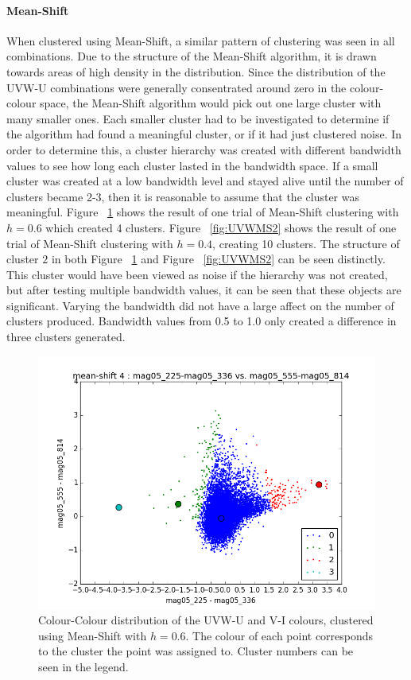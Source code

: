 \paragraph{Mean-Shift}
When clustered using Mean-Shift, a similar pattern of clustering was seen in all combinations.
Due to the structure of the Mean-Shift algorithm, it is drawn towards areas of high density in the distribution. %
Since the distribution of the UVW-U combinations were generally consentrated around zero in the colour-colour space, the Mean-Shift algorithm would pick out one large cluster with many smaller ones. 
Each smaller cluster had to be investigated to determine if the algorithm had found a meaningful cluster, or if it had just clustered noise.
In order to determine this, a cluster hierarchy was created with different bandwidth values to see how long each cluster lasted in the bandwidth space. 
If a small cluster was created at a low bandwidth level and stayed alive until the number of clusters became 2-3, then it is reasonable to assume that the cluster was meaningful.
Figure ~\ref{fig:UVWMS1} shows the result of one trial of Mean-Shift clustering with $h=0.6$ which created 4 clusters. 
Figure ~\ref{fig:UVWMS2} shows the result of one trial of Mean-Shift clustering with $h=0.4$, creating 10 clusters. 
The structure of cluster $2$ in both Figure ~\ref{fig:UVWMS1} and Figure ~\ref{fig:UVWMS2} can be seen distinctly. 
This cluster would have been viewed as noise if the hierarchy was not created, but after testing multiple bandwidth values, it can be seen that these objects are significant.
Varying the bandwidth did not have a large affect on the number of clusters produced. Bandwidth values from 0.5 to 1.0 only created a difference in three clusters generated. 

\begin{figure}
\centering
\includegraphics[width=\linewidth]{figs/meanshift_color_4cl_mag05_225-mag05_336vsmag05_555-mag05_814}
\caption{Colour-Colour distribution of the UVW-U and V-I colours, clustered using Mean-Shift with $h=0.6$. The colour of each point corresponds to the cluster the point was assigned to. Cluster numbers can be seen in the legend.}
\label{fig:UVWMS1}
\end{figure}

